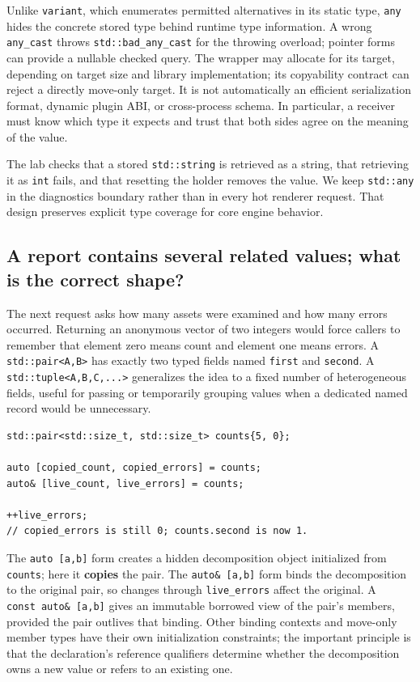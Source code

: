 Unlike \texttt{variant}, which enumerates permitted alternatives in its static type, \texttt{any} hides the concrete stored type behind runtime type information. A wrong \texttt{any\_cast} throws \texttt{std::bad\_any\_cast} for the throwing overload; pointer forms can provide a nullable checked query. The wrapper may allocate for its target, depending on target size and library implementation; its copyability contract can reject a directly move-only target. It is not automatically an efficient serialization format, dynamic plugin ABI, or cross-process schema. In particular, a receiver must know which type it expects and trust that both sides agree on the meaning of the value.

The lab checks that a stored \texttt{std::string} is retrieved as a string, that retrieving it as \texttt{int} fails, and that resetting the holder removes the value. We keep \texttt{std::any} in the diagnostics boundary rather than in every hot renderer request. That design preserves explicit type coverage for core engine behavior.

\subsection{A report contains several related values; what is the correct shape?}\label{01-foundations-i-ch006-a-report-contains-several-related-values-what-is-the-correct-shape}

The next request asks how many assets were examined and how many errors occurred. Returning an anonymous vector of two integers would force callers to remember that element zero means count and element one means errors. A \texttt{std::pair\textless{}A,B\textgreater{}} has exactly two typed fields named \texttt{first} and \texttt{second}. A \texttt{std::tuple\textless{}A,B,C,...\textgreater{}} generalizes the idea to a fixed number of heterogeneous fields, useful for passing or temporarily grouping values when a dedicated named record would be unnecessary.

\begin{verbatim}
std::pair<std::size_t, std::size_t> counts{5, 0};

auto [copied_count, copied_errors] = counts;
auto& [live_count, live_errors] = counts;

++live_errors;
// copied_errors is still 0; counts.second is now 1.
\end{verbatim}

The \texttt{auto\ {[}a,b{]}} form creates a hidden decomposition object initialized from \texttt{counts}; here it \textbf{copies} the pair. The \texttt{auto\&\ {[}a,b{]}} form binds the decomposition to the original pair, so changes through \texttt{live\_errors} affect the original. A \texttt{const\ auto\&\ {[}a,b{]}} gives an immutable borrowed view of the pair's members, provided the pair outlives that binding. Other binding contexts and move-only member types have their own initialization constraints; the important principle is that the declaration's reference qualifiers determine whether the decomposition owns a new value or refers to an existing one.

